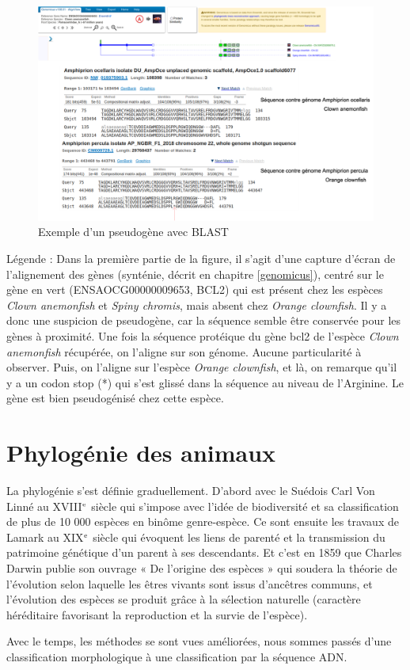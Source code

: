 \begin{figure}[H]
    \centering
    \includegraphics[width=1\textwidth]{figures/corps/figure4.png}
    \caption{Exemple d'un pseudogène avec BLAST}
    \label{fig:4_blast}
\end{figure}
Légende : Dans la première partie de la figure, il s’agit d’une capture d’écran de l’alignement des gènes (synténie, décrit en chapitre \ref{genomicus}), centré sur le gène en vert (ENSAOCG00000009653, BCL2) qui est présent chez les espèces \textit{Clown anemonfish} et \textit{Spiny chromis}, mais absent chez \textit{Orange clownfish}. Il y a donc une suspicion de pseudogène, car la séquence semble être conservée pour les gènes à proximité. Une fois la séquence protéique du gène bcl2 de l’espèce \textit{Clown anemonfish} récupérée, on l’aligne sur son génome. Aucune particularité à observer. Puis, on l’aligne sur l’espèce \textit{Orange clownfish}, et là, on remarque qu’il y a un codon stop (*) qui s’est glissé dans la séquence au niveau de l’Arginine. Le gène est bien pseudogénisé chez cette espèce. 

\newpage
\section{Phylogénie des animaux}\label{phylo}
\par La phylogénie s’est définie graduellement. D’abord avec le Suédois Carl Von Linné au XVIII$\textsuperscript{e}$ siècle qui s’impose avec l’idée de biodiversité et sa classification de plus de 10 000 espèces en binôme genre-espèce. Ce sont ensuite les travaux de Lamark au XIX$\textsuperscript{e}$ siècle qui évoquent les liens de parenté et la transmission du patrimoine génétique d’un parent à ses descendants. Et c’est en 1859 que Charles Darwin publie son ouvrage « De l’origine des espèces » qui soudera la théorie de l’évolution selon laquelle les êtres vivants sont issus d’ancêtres communs, et l’évolution des espèces se produit grâce à la sélection naturelle (caractère héréditaire favorisant la reproduction et la survie de l’espèce). 
\par Avec le temps, les méthodes se sont vues améliorées, nous sommes passés d’une classification morphologique à une classification par la séquence ADN. 


